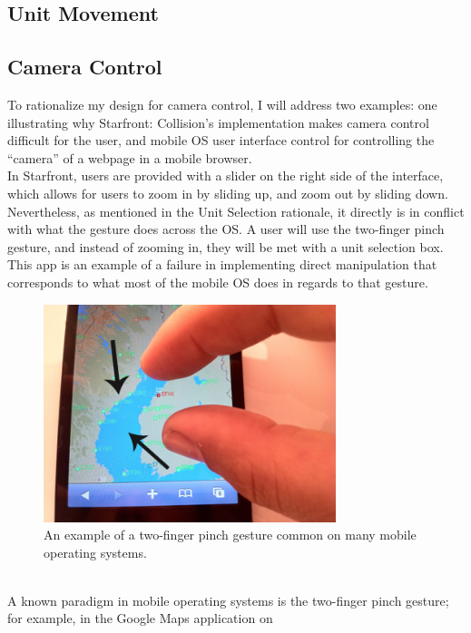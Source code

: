 \documentclass[11pt]{article}
\begin{document}
	\subsection{Unit Movement}
	\subsection{Camera Control}
	To rationalize my design for camera control, I will address two examples: one illustrating why Starfront: Collision's implementation makes camera control difficult for the user, and mobile OS user interface control for controlling the ``camera'' of a webpage in a mobile browser. \\
	\indent In Starfront, users are provided with a slider on the right side of the interface, which allows for users to zoom in by sliding up, and zoom out by sliding down. Nevertheless, as mentioned in the Unit Selection rationale, it directly is in conflict with what the gesture does across the OS. A user will use the two-finger pinch gesture, and instead of zooming in, they will be met with a unit selection box. This app is an example of a failure in implementing direct manipulation that corresponds to what most of the mobile OS does in regards to that gesture.
	\begin{figure}[h]
	\begin{center}
	\includegraphics[height = 2.5in]{iphone-two-finger-pinch}
	\caption{An example of a two-finger pinch gesture common on many mobile operating systems.}
	\end{center}
	\end{figure} \\
	\indent A known paradigm in mobile operating systems is the two-finger pinch gesture; for example, in the Google Maps application on
\end{document}
